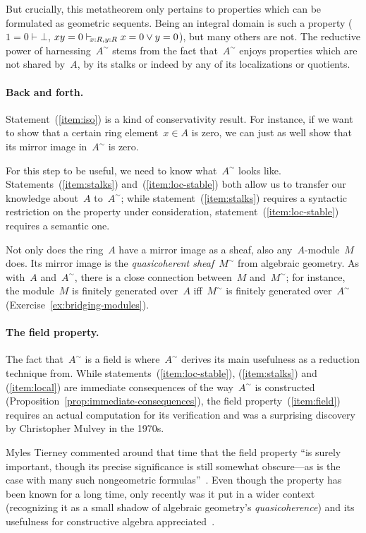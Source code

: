 \documentclass{ws-rv9x6}
\begin{document}
{But crucially, this metatheorem only pertains to properties which can be
formulated as geometric sequents. Being an integral domain is such a property
($1 = 0 \vdash \bot$, $xy = 0 \mathrel{\vdash\!\!\!_{x:R,y:R}} x = 0 \vee y = 0$), but many others
are not. The reductive power of harnessing~$A^\sim$ stems from the fact
that~$A^\sim$ enjoys properties which are not shared by~$A$, by its stalks or
indeed by any of its localizations or quotients.

\paragraph{Back and forth.}
Statement~(\ref{item:iso}) is a kind of conservativity result.
For instance, if we
want to show that a certain ring element~$x \in A$ is zero, we can just as well
show that its mirror image in~$A^\sim$ is zero.

For this step to be useful, we need to know what~$A^\sim$ looks like.
Statements~(\ref{item:stalks}) and~(\ref{item:loc-stable}) both allow us to
transfer our knowledge about~$A$ to~$A^\sim$; while
statement~(\ref{item:stalks}) requires a syntactic restriction on the property
under consideration, statement~(\ref{item:loc-stable}) requires a semantic one.

Not only does the ring~$A$ have a mirror image as a sheaf, also
any~$A$-module~$M$ does. Its mirror image is the \emph{quasicoherent
sheaf}~$M^\sim$ from algebraic geometry. As with~$A$ and~$A^\sim$, there is a
close connection between~$M$ and~$M^\sim$; for instance, the module~$M$ is
finitely generated over~$A$ iff~$M^\sim$ is finitely generated over~$A^\sim$
(Exercise~\ref{ex:bridging-modules}).

\paragraph{The field property.}
The fact that~$A^\sim$ is a field is where~$A^\sim$ derives its main usefulness as a reduction technique
from. While statements~(\ref{item:loc-stable}), (\ref{item:stalks}) and
(\ref{item:local}) are immediate consequences of the way~$A^\sim$ is
constructed (Proposition~\ref{prop:immediate-consequences}), the field property~(\ref{item:field})
requires an actual computation for its verification and was a surprising
discovery by Christopher Mulvey in the 1970s.

Myles Tierney commented around that time that the field property ``is surely important,
though its precise significance is still somewhat obscure---as is the case with
many such nongeometric formulas''~\cite[p.~209]{tierney:spectrum}. Even though
the property has been known for a long time, only recently was it put in a
wider context (recognizing it as a small shadow of algebraic geometry's
\emph{quasicoherence}) and its usefulness for constructive algebra
appreciated~\cite[Sections~3.3 and~11.4]{blechschmidt:phd}.

}
\end{document}

